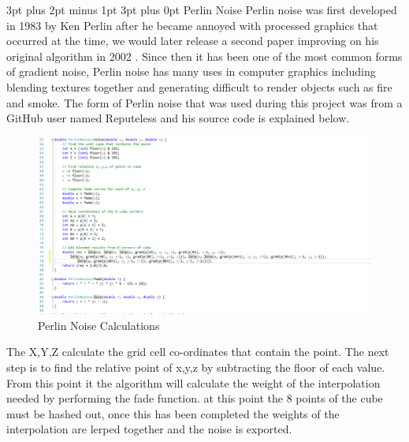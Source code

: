 \documentclass[12pt,a4paper,oneside]{book}
\makeatletter
\renewcommand\subsection{\@startsection {subsection}{1}{2mm} %
                               {3pt plus 2pt minus 1pt} %
                               {3pt plus 0pt} %
                               {\normalfont\bfseries}}
\makeatother
\begin{document}
\subsection{Perlin Noise}
Perlin noise was first developed in 1983 by Ken Perlin after he became annoyed with processed graphics that occurred at the time, we would later release a second paper improving on his original algorithm in 2002 \cite{Noise}. Since then it has been one of the most common forms of gradient noise, Perlin noise has many uses in computer graphics including blending textures together and generating difficult to render objects such as fire and smoke. The form of Perlin noise that was used during this project was from a GitHub user named Reputeless and his source code is explained below.
\begin{figure}[h]
	\includegraphics[width=1.0\textwidth]{images/code.png}
	\caption{Perlin Noise Calculations}
\end{figure}
\vspace{5mm} 
\newline
The X,Y,Z calculate the grid cell co-ordinates that contain the point. The next step is to find the relative point of x,y,z by subtracting the floor of each value. From this point it the algorithm will calculate the weight of the interpolation needed by performing the fade function. at this point the 8 points of the cube must be hashed out, once this has been completed the weights of the interpolation are lerped together and the noise is exported. 
\end{document}
